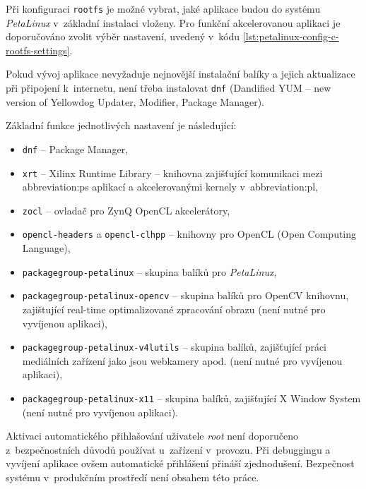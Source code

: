 \documentclass[a4paper, twoside, 11pt]{article}
\begin{document}
		Při konfiguraci \texttt{rootfs} je možné vybrat, jaké aplikace budou do systému \textit{PetaLinux} v~základní instalaci vloženy. Pro funkční akcelerovanou aplikaci je doporučováno zvolit výběr nastavení, uvedený v~kódu \ref{lst:petalinux-config-c-rootfs-settings}.\par
		Pokud vývoj aplikace nevyžaduje nejnovější instalační balíky a jejich aktualizace při připojení k~internetu, není třeba instalovat \texttt{dnf} (Dandified YUM – new version of Yellowdog Updater, Modifier, Package Manager).\par
		Základní funkce jednotlivých nastavení je následující:
		\begin{itemize}
			\item \texttt{dnf} – Package Manager,
			\item \texttt{xrt} – Xilinx Runtime Library – knihovna zajišťující komunikaci mezi \gls{abbreviation:ps} aplikací a akcelerovanými kernely v~\gls{abbreviation:pl},
			\item \texttt{zocl} – ovladač pro ZynQ OpenCL akcelerátory,
			\item \texttt{opencl-headers} a \texttt{opencl-clhpp} – knihovny pro OpenCL (Open Computing Language),
			\item \texttt{packagegroup-petalinux} – skupina balíků pro \textit{PetaLinux},
			\item \texttt{packagegroup-petalinux-opencv} – skupina balíků pro OpenCV knihovnu, zajištující real-time optimalizované zpracování obrazu (není nutné pro vyvíjenou aplikaci),
			\item \texttt{packagegroup-petalinux-v4lutils} – skupina balíků, zajišťující práci mediálních zařízení jako jsou webkamery apod. (není nutné pro vyvíjenou aplikaci),
			\item \texttt{packagegroup-petalinux-x11} – skupina balíků, zajišťující X Window System (není nutné pro vyvíjenou aplikaci).
		\end{itemize}
		\vspace*{0.75cm}
		Aktivaci automatického přihlašování uživatele \textit{root} není doporučeno  z~bezpečnostních důvodů používat u~zařízení v~provozu. Při debuggingu a vyvíjení aplikace ovšem automatické přihlášení přináší zjednodušení. Bezpečnost systému v~produkčním prostředí není obsahem této práce.\par
\end{document}
